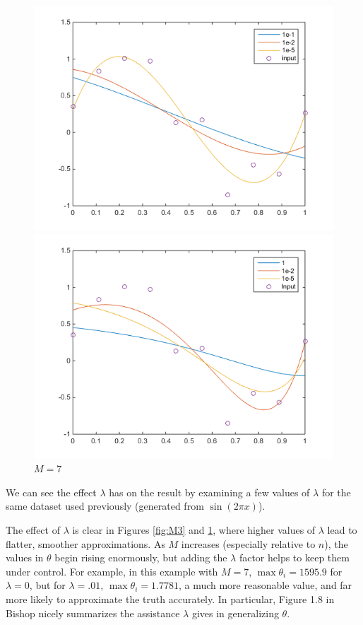 \documentclass[10pt,letterpaper]{article}
\begin{document}
\begin{figure}[!htb]
  \includegraphics[width=\linewidth]{figures/M3.png}
  \caption{$M=3$}\label{fig:M3}
\endminipage\hfill
{}
  \includegraphics[width=\linewidth]{figures/M7.png}
  \caption{$M=7$}\label{fig:M7}
\endminipage
\end{figure}
We can see the effect $\lambda$ has on the result by examining a few values of $\lambda$ for the same dataset used previously (generated from $\sin(2\pi x)$).

The effect of $\lambda$ is clear in Figures \ref{fig:M3} and \ref{fig:M7}, where higher values of $\lambda$ lead to flatter, smoother approximations. As $M$ increases (especially relative to $n$), the values in $\theta$ begin rising enormously, but adding the $\lambda$ factor helps to keep them under control. For example, in this example with $M=7$, $\max \theta_i = 1595.9$ for $\lambda = 0$, but for $\lambda = .01$, $\max \theta_i = 1.7781$, a much more reasonable value, and far more likely to approximate the truth accurately. In particular, Figure 1.8 in Bishop nicely summarizes the assistance $\lambda$ gives in generalizing $\theta$.
\end{document}
